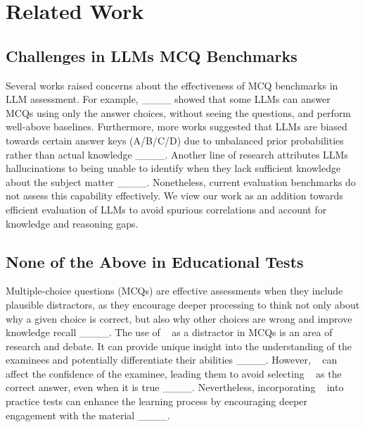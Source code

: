 \section{Related Work}
\subsection{Challenges in LLMs MCQ Benchmarks }

Several works raised concerns about the effectiveness of MCQ benchmarks in LLM
assessment. For example, ____ showed
that some LLMs can answer MCQs using only the answer choices, without seeing
the questions, and perform well-above baselines. Furthermore, more works
suggested that LLMs are biased towards certain answer keys (A/B/C/D) due to
unbalanced prior probabilities rather than actual knowledge
____.
Another line of research attributes LLMs hallucinations to being unable to
identify when they lack sufficient knowledge about the subject matter
____.
Nonetheless, current evaluation benchmarks do not assess this capability
effectively. We view our work as an addition towards efficient evaluation of
LLMs to avoid spurious correlations and account for knowledge and reasoning
gaps.

\subsection{None of the Above in Educational Tests}

Multiple-choice questions (MCQs) are effective assessments when they include
plausible distractors, as they encourage deeper processing to think not only
about why a given choice is correct, but also why other choices are wrong and
improve knowledge recall ____. The use
of \nota~ as a distractor in MCQs is an area of research and debate. It can
provide unique insight into the understanding of the examinees and potentially
differentiate their abilities ____.
However, \nota~ can affect the confidence of the examinee, leading them to
avoid selecting \nota~ as the correct answer, even when it is true
____. Nevertheless, incorporating \nota~ into
practice tests can enhance the learning process by encouraging deeper
engagement with the material ____.
